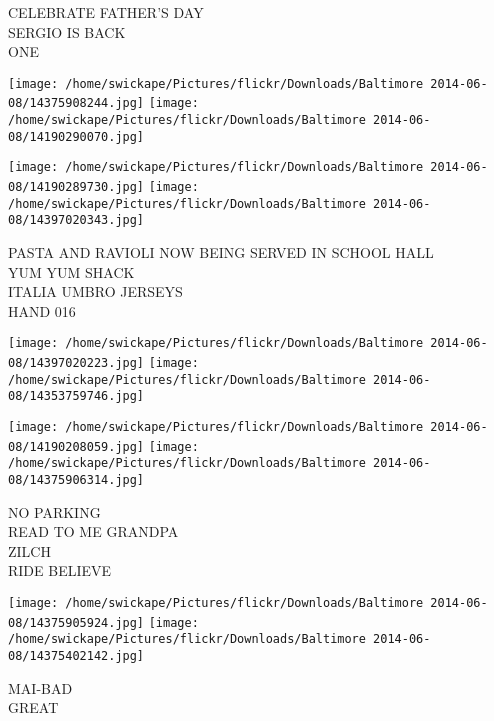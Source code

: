 \documentclass[10pt,letterpaper]{article}
\begin{document}
CELEBRATE FATHER'S DAY\\
SERGIO IS BACK\\
ONE
\pagebreak

\texttt{[image: /home/swickape/Pictures/flickr/Downloads/Baltimore 2014-06-08/14375908244.jpg]}
\texttt{[image: /home/swickape/Pictures/flickr/Downloads/Baltimore 2014-06-08/14190290070.jpg]}

\texttt{[image: /home/swickape/Pictures/flickr/Downloads/Baltimore 2014-06-08/14190289730.jpg]}
\texttt{[image: /home/swickape/Pictures/flickr/Downloads/Baltimore 2014-06-08/14397020343.jpg]}

PASTA AND RAVIOLI NOW BEING SERVED IN SCHOOL HALL\\
YUM YUM SHACK\\
ITALIA UMBRO JERSEYS\\
HAND 016
\pagebreak

\texttt{[image: /home/swickape/Pictures/flickr/Downloads/Baltimore 2014-06-08/14397020223.jpg]}
\texttt{[image: /home/swickape/Pictures/flickr/Downloads/Baltimore 2014-06-08/14353759746.jpg]}

\texttt{[image: /home/swickape/Pictures/flickr/Downloads/Baltimore 2014-06-08/14190208059.jpg]}
\texttt{[image: /home/swickape/Pictures/flickr/Downloads/Baltimore 2014-06-08/14375906314.jpg]}

NO PARKING\\
READ TO ME GRANDPA\\
ZILCH\\
RIDE BELIEVE
\pagebreak

\texttt{[image: /home/swickape/Pictures/flickr/Downloads/Baltimore 2014-06-08/14375905924.jpg]}
\texttt{[image: /home/swickape/Pictures/flickr/Downloads/Baltimore 2014-06-08/14375402142.jpg]}

MAI{-}BAD\\
GREAT
\pagebreak
\end{document}
